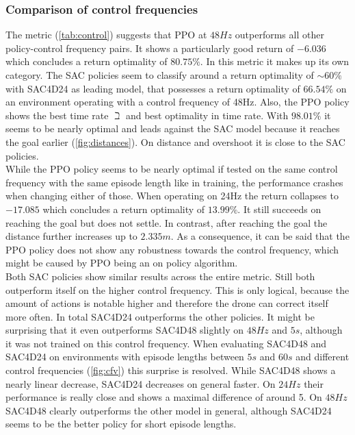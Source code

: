 
\newpage




\subsubsection{Comparison of control frequencies}
The metric (\cref{tab:control}) suggests that PPO at $48Hz$ outperforms all other policy-control frequency pairs. 
It shows a particularly good return of $-6.036$ which concludes a return optimality of $80.75 \%$. 
In this metric it makes up its own category. 
The SAC policies seem to classify around a return optimality of $\sim 60 \%$ with SAC4D24 as leading model, 
that possesses a return optimality of $66.54 \%$ on an environment operating with a control frequency of 48Hz. 
Also, the PPO policy shows the best time rate $\beth$ and best optimality in time rate. 
With $98.01 \%$ it seems to be nearly optimal and leads against the SAC model because it reaches the goal earlier (\cref{fig:distances}). 
On distance and overshoot it is close to the SAC policies.\\
While the PPO policy seems to be nearly optimal if tested on the same control frequency with the same episode length like in training, 
the performance crashes when changing either of those. 
When operating on 24Hz the return collapses to $-17.085$ which concludes a return optimality of $13.99 \%$.
It still succeeds on reaching the goal but does not settle. In contrast, after reaching the goal the distance further increases up to $2.335m$. 
As a consequence, it can be said that the PPO policy does not show any robustness towards the control frequency, 
which might be caused by PPO being an on policy algorithm.\\
Both SAC policies show similar results across the entire metric. 
Still both outperform itself on the higher control frequency. 
This is only logical, because the amount of actions is notable higher and therefore the drone can correct itself more often. 
In total SAC4D24 outperforms the other policies. It might be surprising that it even outperforms
 SAC4D48 slightly on $48Hz$ and $5s$, although it was not trained on this control frequency.  
When evaluating SAC4D48 and SAC4D24 on environments with episode lengths between $5s$ and $60s$ and different control
 frequencies (\cref{fig:cfv}) this surprise is resolved. While SAC4D48 shows a nearly linear decrease, SAC4D24 decreases on general faster. 
 On $24Hz$ their performance is really close and shows a maximal difference of around 5. 
 On $48Hz$ SAC4D48 clearly outperforms the other model in general, although SAC4D24 seems to be the better policy for short episode lengths.

